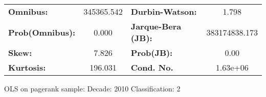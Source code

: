 \begin{center}
\begin{tabular}{lccccc}
\bottomrule
\end{tabular}
\begin{tabular}{lclc}
\textbf{Omnibus:}       & 345365.542 & \textbf{  Durbin-Watson:     } &       1.798    \\
\textbf{Prob(Omnibus):} &    0.000   & \textbf{  Jarque-Bera (JB):  } & 383174838.173  \\
\textbf{Skew:}          &    7.826   & \textbf{  Prob(JB):          } &        0.00    \\
\textbf{Kurtosis:}      &  196.031   & \textbf{  Cond. No.          } &    1.63e+06    \\
\bottomrule
\end{tabular}
\end{center}
\break
OLS on pagerank sample: Decade: 2010 Classification: 2
